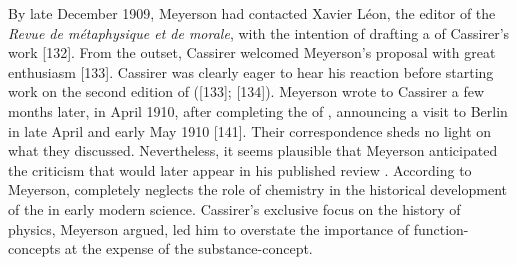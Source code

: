 \documentclass[submitted,12pt]{article}
\begin{document}

By late December 1909, Meyerson had contacted Xavier Léon, the editor of the \emph{Revue de métaphysique et de morale}, with the intention of drafting a  of Cassirer’s work [132]. From the outset, Cassirer welcomed Meyerson’s proposal with great enthusiasm [133]. Cassirer was clearly eager to hear his reaction before starting work on the second edition of \EPt  ([133]; [134]). Meyerson wrote to Cassirer a few months later, in April 1910, after completing the  of \EPt, announcing a visit to Berlin in late April and early May 1910 [141]. Their correspondence sheds no light on what they discussed. Nevertheless, it seems plausible that Meyerson anticipated the criticism that would later appear in his published review \citep{Meyerson1911}. According to Meyerson, \EPt completely neglects the role of chemistry in the historical development of the  in early modern science. Cassirer's exclusive focus on the history of physics, Meyerson argued, led him to overstate the importance of function-concepts at the expense of the substance-concept.


\end{document}
